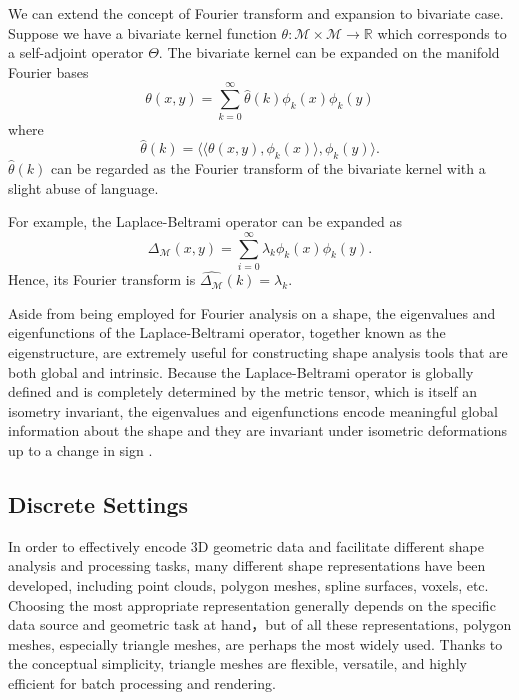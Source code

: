 We can extend the concept of Fourier transform and expansion to bivariate case. Suppose we have
a bivariate kernel function $\theta:\mathcal{M}\times\mathcal{M}\to\mathbb{R}$ which corresponds
to a self-adjoint operator $\Theta$. The bivariate kernel can be expanded on the manifold Fourier bases
\begin{equation}
\theta(x,y)=\sum_{k=0}^\infty \hat{\theta}(k)\phi_k(x)\phi_k(y)
\end{equation}
where
\begin{equation}
\hat{\theta}(k)=\langle\langle\theta(x,y),\phi_k(x)\rangle,\phi_k(y)\rangle.
\end{equation}
$\hat{\theta}(k)$ can be regarded as the Fourier transform of the bivariate kernel with a slight abuse of language.

For example, the Laplace-Beltrami operator can be expanded as
\begin{equation}
\Delta_\mathcal{M}(x,y)=\sum_{i=0}^\infty \lambda_k\phi_k(x)\phi_k(y).
\end{equation}
Hence, its Fourier transform is $\widehat{\Delta_\mathcal{M}}(k)=\lambda_k$.

Aside from being employed for Fourier analysis on a shape, the eigenvalues and eigenfunctions of the
Laplace-Beltrami operator, together known as the eigenstructure, are extremely useful for
constructing shape analysis tools that are both global and intrinsic. Because the Laplace-Beltrami
operator is globally defined and is completely determined by the metric tensor, which is itself an
isometry invariant, the eigenvalues and eigenfunctions encode meaningful global information about
the shape and they are invariant under isometric deformations up to a change in
sign \cite{Rustamov:2007:LEF,Sun:2009:CGF}.

\subsection*{Discrete Settings}

In order to effectively encode 3D geometric data and facilitate different
shape analysis and processing tasks, many different shape representations have
been developed, including point clouds, polygon meshes, spline surfaces,
voxels, etc. Choosing the most appropriate representation generally depends on the
specific data source and geometric task at hand，but of all these representations,
polygon meshes, especially triangle meshes, are perhaps the most widely used.
Thanks to the conceptual simplicity, triangle meshes are flexible, versatile,
and highly efficient for batch processing and rendering.

